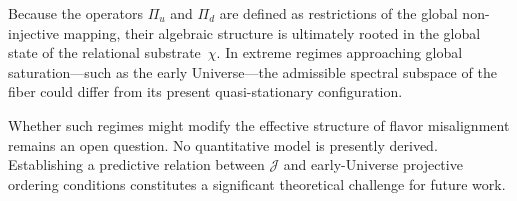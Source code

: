     Because the operators $\Pi_u$ and $\Pi_d$ are defined as
    restrictions of the global non-injective mapping,
    their algebraic structure is ultimately rooted in the global
    state of the relational substrate~$\chi$.
    In extreme regimes approaching global saturation---such as the
    early Universe---the admissible spectral subspace of the fiber
    could differ from its present quasi-stationary configuration.

    Whether such regimes might modify the effective structure of
    flavor misalignment remains an open question.
    No quantitative model is presently derived.
    Establishing a predictive relation between $\mathcal{J}$ and
    early-Universe projective ordering conditions constitutes a
    significant theoretical challenge for future work.
